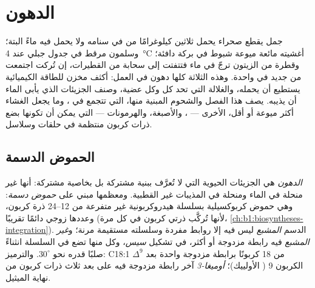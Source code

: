 \chapter{الدهون}\label{ch:b1:lipids}

جمل يقطع صحراء يحمل ثلاثين كيلوغرامًا من  في سنامه ولا يحمل فيه
ماءً البتة؛ وسلمون مرقط في جدول جبلي عند \qty{4}{\celsius} أغشيته
مائعة ميوعة  شبوط في بركة دافئة؛ وقطرة من  الزيتون ترجّ في
ماء فتتفتت إلى سحابة من القطيرات، إن تُركت اجتمعت من جديد في واحدة.
وهذه الثلاثة كلها دهون في العمل: أكثف مخزن للطاقة الكيميائية يستطيع
 أن يحمله، والغلالة التي تحد كل  وكل عضية، وصنف الجزيئات
الذي يأبى الماء أن يذيبه. يصف هذا الفصل  والشحوم
المبنية منها،   التي تتجمع في ، وما يجعل
الغشاء أكثر ميوعة أو أقل،  الأخرى --- ، والأصبغة،
والهرمونات --- التي يمكن أن تكونها بضع ذرات كربون منتظمة في حلقات
وسلاسل.

\section{الحموض الدسمة}

\begin{definition}\label{def:b1:lipids:fattyacid}
\emph{الدهون} هي الجزيئات الحيوية التي لا تُعرَّف ببنية
مشتركة بل بخاصية مشتركة: أنها غير منحلة في الماء ومنحلة في المذيبات
غير القطبية. ومعظمها مبني على \emph{حموض دسمة}: وهي
حموض كربوكسيلية بسلسلة هيدروكربونية غير متفرعة من
\qtyrange{12}{24}{} ذرة كربون، وعددها زوجي دائمًا تقريبًا (لأنها
تُركَّب ذرتي كربون في كل مرة، \cref{ch:b1:biosyntheses-integration}).
 الدسم \emph{المشبع} ليس فيه إلا روابط
مفردة وسلسلته مستقيمة مرنة؛ و\emph{غير المشبع}
فيه رابطة مزدوجة أو أكثر، في تشكيل \emph{سيس}، وكل منها تضع في
السلسلة انثناءً صلبًا قدره نحو $30^\circ$. والترميز: C18:1
$\Delta^9$  من 18 كربونًا برابطة مزدوجة واحدة بعد الكربون 9 (
الأولييك)؛  \emph{أوميغا-3} آخر رابطة مزدوجة فيه على بعد ثلاث
ذرات كربون من نهاية الميثيل.
\end{definition}

